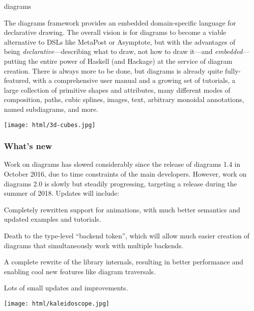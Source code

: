 \begin{hcarentry}{diagrams}
\makeheader

The diagrams framework provides an embedded domain-specific language for
declarative drawing. The overall vision is for diagrams to become a viable
alternative to DSLs like MetaPost or Asymptote, but with the advantages of
being \emph{declarative}---describing what to draw, not how to draw it---and
\emph{embedded}---putting the entire power of Haskell (and Hackage) at the
service of diagram creation. There is always more to be done, but diagrams is
already quite fully-featured, with a comprehensive user manual and a growing
set of tutorials, a large collection of primitive shapes and attributes, many
different modes of composition, paths, cubic splines, images, text, arbitrary
monoidal annotations, named subdiagrams, and more.

\begin{center}
\texttt{[image: html/3d-cubes.jpg]}
\end{center}

\subsubsection*{What's new}

Work on diagrams has slowed considerably since the release of diagrams
1.4 in October 2016, due to time constraints of the main developers.
However, work on diagrams 2.0 is slowly but steadily progressing,
targeting a release during the summer of 2018.  Updates will include:

\begin{compactitem}
\item Completely rewritten support for animations, with much better
  semantics and updated examples and tutorials.
\item Death to the type-level ``backend token'', which will allow much
  easier creation of diagrams that simultaneously work with multiple
  backends.
\item A complete rewrite of the library internals, resulting in better
  performance and enabling cool new features like diagram traversals.
\item Lots of small updates and improvements.
\end{compactitem}

\begin{center}
\texttt{[image: html/kaleidoscope.jpg]}
\end{center}


\end{hcarentry}

